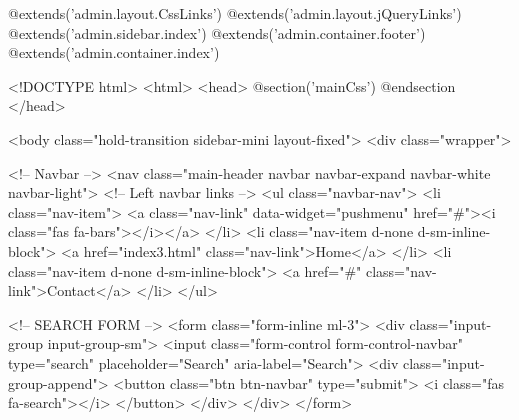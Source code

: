 @extends('admin.layout.CssLinks')
@extends('admin.layout.jQueryLinks')
@extends('admin.sidebar.index')
@extends('admin.container.footer')
@extends('admin.container.index')

<!DOCTYPE html>
<html>
<head>
  @section('mainCss')
  @endsection
</head>

<body class="hold-transition sidebar-mini layout-fixed">
  <div class="wrapper">

    <!-- Navbar -->
    <nav class="main-header navbar navbar-expand navbar-white navbar-light">
      <!-- Left navbar links -->
      <ul class="navbar-nav">
        <li class="nav-item">
          <a class="nav-link" data-widget="pushmenu" href="#"><i class="fas fa-bars"></i></a>
        </li>
        <li class="nav-item d-none d-sm-inline-block">
          <a href="index3.html" class="nav-link">Home</a>
        </li>
        <li class="nav-item d-none d-sm-inline-block">
          <a href="#" class="nav-link">Contact</a>
        </li>
      </ul>
  
      <!-- SEARCH FORM -->
      <form class="form-inline ml-3">
        <div class="input-group input-group-sm">
          <input class="form-control form-control-navbar" type="search" placeholder="Search" aria-label="Search">
          <div class="input-group-append">
            <button class="btn btn-navbar" type="submit">
              <i class="fas fa-search"></i>
            </button>
          </div>
        </div>
      </form>
  
